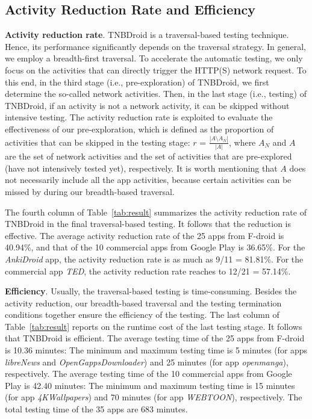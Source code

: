 \documentclass[sigconf,review, anonymous]{acmart}
\begin{document}
\subsection{Activity Reduction Rate and Efficiency}
\textbf{Activity reduction rate}. \textsf{TNBDroid} is a traversal-based testing technique. Hence, its performance significantly depends on the traversal strategy. In general, we employ a breadth-first traversal. To accelerate the automatic testing, we only focus on the activities that can directly trigger the HTTP(S) network request. To this end, in the third stage (i.e., pre-exploration) of \textsf{TNBDroid}, we first determine the so-called network activities. Then, in the last stage (i.e., testing) of \textsf{TNBDroid}, if an activity is not a network activity, it can be skipped without intensive testing. The activity reduction rate is exploited to evaluate the effectiveness of our pre-exploration, which is defined as the proportion of activities that can be skipped in the testing stage: $r$ = $\frac{|A\setminus A_N|}{|A|}$, where $A_N$ and $A$ are the set of network activities and the set of activities that are pre-explored (have not intensively tested yet), respectively. It is worth mentioning that $A$ does not necessarily include all the app activities, because certain activities can be missed by during our breadth-based traversal.  

The fourth column of Table~\ref{tab:result} summarizes the activity reduction rate of \textsf{TNBDroid} in the final traversal-based testing. It follows that the reduction is effective. The average activity reduction rate of the 25 apps from F-droid is 40.94\%, and that of the 10 commercial apps from Google Play is 36.65\%. For the \textit{AnkiDroid} app, the activity reduction rate is as much as 9/11 = 81.81\%. For the commercial app \textit{TED}, the activity reduction rate reaches to 12/21 = 57.14\%. 


\textbf{Efficiency}. Usually, the traversal-based testing is time-consuming. Besides the activity reduction, our breadth-based traversal and the testing termination conditions together ensure the efficiency of the testing. The last column of Table~\ref{tab:result} reports on the runtime cost of the last testing stage. It follows that \textsf{TNBDroid} is efficient. The average testing time of the 25 apps from F-droid is 10.36 minutes: The minimum and maximum testing time is 5 minutes (for apps \textit{libreNews} and \textit{OpenGappsDownloader}) and 25 minutes (for app \textit{openmanga}), respectively.
The average testing time of the 10 commercial apps from Google Play is 42.40 minutes: The minimum and maximum testing time is 15 minutes (for app \textit{4KWallpapers}) and 70 minutes (for app \textit{WEBTOON}), respectively. The total testing time of the 35 apps are 683 minutes.
 
\end{document}
